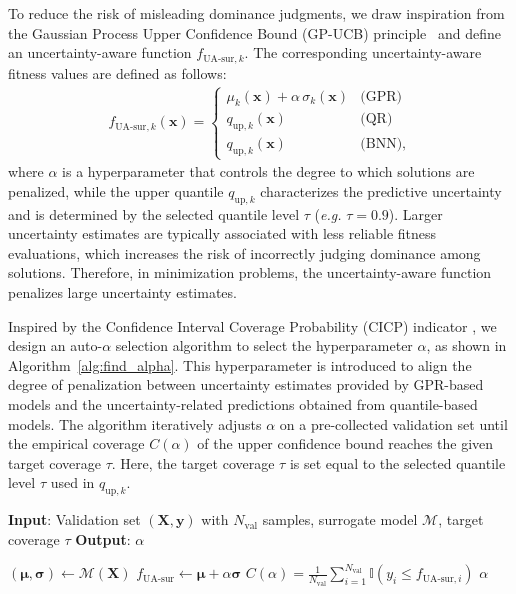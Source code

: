 \documentclass{article}
\begin{document}
To reduce the risk of misleading dominance judgments, we draw inspiration from the Gaussian Process Upper Confidence Bound (GP-UCB) principle~\cite{opt_ucb} and define an uncertainty-aware function $f_{\text{UA-sur},k}$. The corresponding uncertainty-aware fitness values are defined as follows:
\begin{align}
f_{\text{UA-sur},k}(\boldsymbol{x}) =
\begin{cases}
\mu_k(\boldsymbol{x}) + \alpha\, \sigma_k(\boldsymbol{x}) & \text{(GPR)} \\
q_{\text{up},k}(\boldsymbol{x}) & \text{(QR)} \\
q_{\text{up},k}(\boldsymbol{x}) & \text{(BNN)},
\end{cases}
\end{align}
where $\alpha$ is a hyperparameter that controls the degree to which solutions are penalized, while the upper quantile $q_{\text{up},k}$ characterizes the predictive uncertainty and is determined by the selected quantile level $\tau$ (\emph{e.g.} $\tau=0.9$). Larger uncertainty estimates are typically associated with less reliable fitness evaluations, which increases the risk of incorrectly judging dominance among solutions. Therefore, in minimization problems, the uncertainty-aware function penalizes large uncertainty estimates.

Inspired by the Confidence Interval Coverage Probability (CICP) indicator \cite{cicp}, we design an auto-$\alpha$ selection algorithm to select the hyperparameter $\alpha$, as shown in Algorithm~\ref{alg:find_alpha}. This hyperparameter is introduced to align the degree of penalization between uncertainty estimates provided by GPR-based models and the uncertainty-related predictions obtained from quantile-based models. The algorithm iteratively adjusts $\alpha$ on a pre-collected validation set until the empirical coverage $C(\alpha)$ of the upper confidence bound reaches the given target coverage $\tau$. Here, the target coverage $\tau$ is set equal to the selected quantile level $\tau$ used in $q_{\text{up},k}$.

\begin{algorithm}[htbp]
\caption{Auto-$\alpha$ Selection}
\label{alg:find_alpha}
\begin{algorithmic}[1]
\STATE \textbf{Input}: Validation set $(\mathbf{X}, \mathbf{y})$ with $N_{\text{val}}$ samples, surrogate model $\mathcal{M}$, target coverage $\tau$
\STATE \textbf{Output}: $\alpha$

\STATE $(\boldsymbol{\mu}, \boldsymbol{\sigma}) \leftarrow \mathcal{M}(\mathbf{X})$
    \STATE $f_{\text{UA-sur}} \leftarrow \boldsymbol{\mu} + \alpha \boldsymbol{\sigma}$
    \STATE $C(\alpha) = \frac{1}{N_{\text{val}}} \sum_{i=1}^{N_{\text{val}}} \mathbb{I}\!\left(y_i \le f_{\text{UA-sur},i}\right)$
        \RETURN $\alpha$
    \ENDIF
\ENDFOR
\end{algorithmic}
\end{algorithm}
\end{document}
